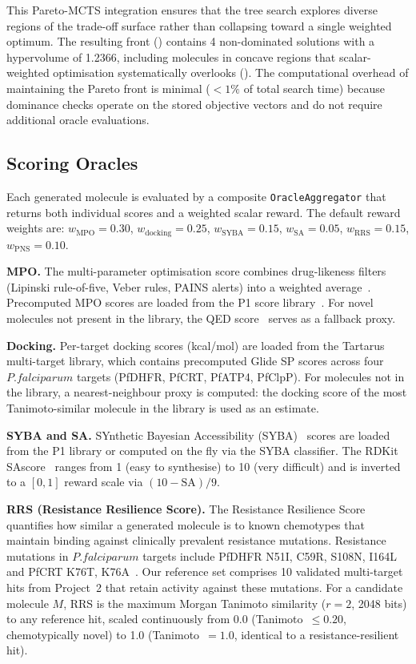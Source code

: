 \documentclass[jcim,article,layout=manuscript]{achemso}
\begin{document}
This Pareto-MCTS integration ensures that the tree search explores diverse
regions of the trade-off surface rather than collapsing toward a single
weighted optimum. The resulting front () contains 4
non-dominated solutions with a hypervolume of 1.2366, including molecules
in concave regions that scalar-weighted optimisation systematically
overlooks (). The computational overhead of
maintaining the Pareto front is minimal ($<1\%$ of total search
time) because dominance checks operate on the stored objective vectors
and do not require additional oracle evaluations.

\subsection{Scoring Oracles}
\label{sec:oracles}

Each generated molecule is evaluated by a composite
\texttt{OracleAggregator} that returns both individual scores and a
weighted scalar reward. The default reward weights are:
$w_{\text{MPO}}=0.30$, $w_{\text{docking}}=0.25$,
$w_{\text{SYBA}}=0.15$, $w_{\text{SA}}=0.05$,
$w_{\text{RRS}}=0.15$, $w_{\text{PNS}}=0.10$.

\textbf{MPO.} The multi-parameter optimisation score combines drug-likeness
filters (Lipinski rule-of-five, Veber rules, PAINS alerts) into a weighted
average~\cite{Wager2010}. Precomputed MPO scores are loaded from the P1
score library~\cite{Temgoua2026a}. For novel molecules not present in the
library, the QED score~\cite{Bickerton2012} serves as a fallback proxy.

\textbf{Docking.} Per-target docking scores (kcal/mol) are loaded from the
Tartarus multi-target library, which contains precomputed Glide SP scores
across four $P. falciparum$ targets (PfDHFR, PfCRT, PfATP4, PfClpP).
For molecules not in the library, a nearest-neighbour proxy is computed:
the docking score of the most Tanimoto-similar molecule in the library is
used as an estimate.

\textbf{SYBA and SA.} SYnthetic Bayesian Accessibility (SYBA)~
\cite{Vorsilak2020} scores are loaded from the P1 library or computed on
the fly via the SYBA classifier. The RDKit SAscore~\cite{Ertl2009} ranges
from 1 (easy to synthesise) to 10 (very difficult) and is inverted to a
$[0,1]$ reward scale via $(10 - \text{SA})/9$.

\textbf{RRS (Resistance Resilience Score).} The Resistance Resilience
Score quantifies how similar a generated molecule is to known chemotypes
that maintain binding against clinically prevalent resistance mutations.
Resistance mutations in $P. falciparum$ targets include PfDHFR N51I,
C59R, S108N, I164L and PfCRT K76T, K76A~\cite{Wicht2024}. Our reference
set comprises 10 validated multi-target hits from Project~2 that retain
activity against these mutations. For a candidate molecule $M$, RRS is
the maximum Morgan Tanimoto similarity ($r=2$, 2048 bits) to any
reference hit, scaled continuously from 0.0 (Tanimoto~$\leq 0.20$,
chemotypically novel) to 1.0 (Tanimoto~$= 1.0$, identical to a
resistance-resilient hit).
\end{document}
